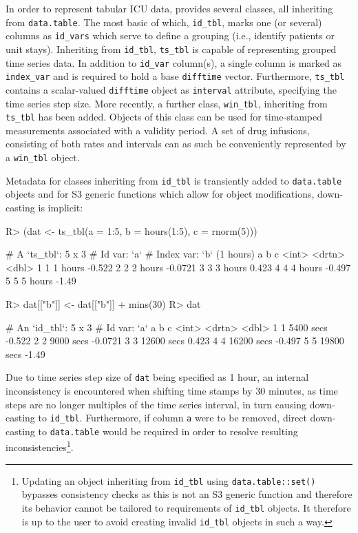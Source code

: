 \documentclass[
  notitle,
  nojss,
  noheadings]{jss}
\begin{document}
In order to represent tabular ICU data,  provides several
classes, all inheriting from \texttt{data.table}. The most basic of
which, \texttt{id\_tbl}, marks one (or several) columns as
\texttt{id\_vars} which serve to define a grouping (i.e., identify
patients or unit stays). Inheriting from \texttt{id\_tbl},
\texttt{ts\_tbl} is capable of representing grouped time series data. In
addition to \texttt{id\_var} column(s), a single column is marked as
\texttt{index\_var} and is required to hold a base 
\texttt{difftime} vector. Furthermore, \texttt{ts\_tbl} contains a
scalar-valued \texttt{difftime} object as \texttt{interval} attribute,
specifying the time series step size. More recently, a further class,
\texttt{win\_tbl}, inheriting from \texttt{ts\_tbl} has been added.
Objects of this class can be used for time-stamped measurements
associated with a validity period. A set of drug infusions, consisting
of both rates and intervals can as such be conveniently represented by a
\texttt{win\_tbl} object.

Metadata for classes inheriting from \texttt{id\_tbl} is transiently
added to \texttt{data.table} objects and for S3 generic functions which
allow for object modifications, down-casting is implicit:

\begin{CodeChunk}
\begin{CodeInput}
R> (dat <- ts_tbl(a = 1:5, b = hours(1:5), c = rnorm(5)))
\end{CodeInput}
\begin{CodeOutput}
# A `ts_tbl`: 5 x 3
# Id var:     `a`
# Index var:  `b` (1 hours)
      a b             c
  <int> <drtn>    <dbl>
1     1 1 hours -0.522
2     2 2 hours -0.0721
3     3 3 hours  0.423
4     4 4 hours -0.497
5     5 5 hours -1.49
\end{CodeOutput}
\begin{CodeInput}
R> dat[["b"]] <- dat[["b"]] + mins(30)
R> dat
\end{CodeInput}
\begin{CodeOutput}
# An `id_tbl`: 5 x 3
# Id var:      `a`
      a b                c
  <int> <drtn>       <dbl>
1     1  5400 secs -0.522
2     2  9000 secs -0.0721
3     3 12600 secs  0.423
4     4 16200 secs -0.497
5     5 19800 secs -1.49
\end{CodeOutput}
\end{CodeChunk}

Due to time series step size of \texttt{dat} being specified as 1 hour,
an internal inconsistency is encountered when shifting time stamps by 30
minutes, as time steps are no longer multiples of the time series
interval, in turn causing down-casting to \texttt{id\_tbl}. Furthermore,
if column \texttt{a} were to be removed, direct down-casting to
\texttt{data.table} would be required in order to resolve resulting
inconsistencies\footnote{Updating an object inheriting from
  \texttt{id\_tbl} using \texttt{data.table::set()} bypasses consistency
  checks as this is not an S3 generic function and therefore its
  behavior cannot be tailored to requirements of \texttt{id\_tbl}
  objects. It therefore is up to the user to avoid creating invalid
  \texttt{id\_tbl} objects in such a way.}.
\end{document}
